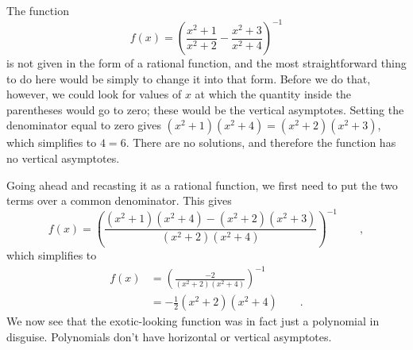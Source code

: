 The function
\begin{equation*}
  f(x) = \left(\frac{x^2+1}{x^2+2}-\frac{x^2+3}{x^2+4}\right)^{-1} 
\end{equation*}
is not given in the form of a rational function, and the most 
straightforward thing to do here would be simply to change it into
that form. Before we do that, however, we could look for values of
$x$ at which the quantity inside the parentheses would go to zero;
these would be the vertical asymptotes. Setting the denominator
equal to zero gives $(x^2+1)(x^2+4)=(x^2+2)(x^2+3)$, which simplifies
to $4=6$. There are no solutions, and therefore the function has no
vertical asymptotes.

Going ahead and recasting it as a rational function, we first need to
put the two terms over a common denominator. This gives
\begin{equation*}
  f(x) = \left(\frac{(x^2+1)(x^2+4)-(x^2+2)(x^2+3)}{(x^2+2)(x^2+4)}\right)^{-1}  \qquad ,
\end{equation*}
which simplifies to
\begin{align*}
  f(x) &= \left(\frac{-2}{(x^2+2)(x^2+4)}\right)^{-1}   \\
       &= -\frac{1}{2}(x^2+2)(x^2+4) \qquad .
\end{align*}
We now see that the exotic-looking function was in fact just a polynomial in
disguise. Polynomials don't have horizontal or vertical asymptotes.
